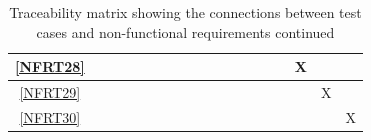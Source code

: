 \documentclass[12pt, titlepage]{article}
\begin{document}
\begin{landscape}
\begin{table}[h!]
\begin{tabular}{|c|c|c|c|c|c|c|c|c|c|c|c|c|c|c|c|c|c|}
      \ref{NFRT28} &      &      &     &     &     &     &     &     &     &     &     &     &     &     & X   &     &     \\ \hline
      \ref{NFRT29} &      &      &     &     &     &     &     &     &     &     &     &     &     &     &     & X   &     \\ \hline
      \ref{NFRT30} &      &      &     &     &     &     &     &     &     &     &     &     &     &     &     &     & X   \\ \hline
    \end{tabular}
    \caption{Traceability matrix showing the connections between test cases
      and non-functional requirements continued}
    \label{tab:nfrt2}
  \end{table}
\end{landscape}
\restoregeometry
\end{document}
